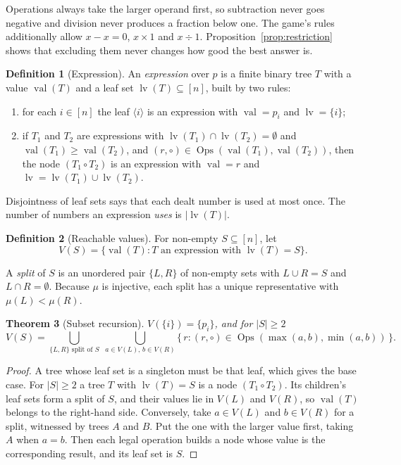 \documentclass[11pt,a4paper]{article}
\newtheorem{theorem}{Theorem}[section]
\theoremstyle{definition}
\newtheorem{definition}[theorem]{Definition}
\theoremstyle{remark}
\newcommand{\Ops}{\operatorname{Ops}}
\newcommand{\val}{\operatorname{val}}
\newcommand{\leaves}{\operatorname{lv}}
\newcommand{\mask}{\mu}
\begin{document}
Operations always take the larger operand first, so subtraction never goes negative and division never
produces a fraction below one. The game's rules additionally allow $x - x = 0$, $x \times 1$ and $x \div 1$.
Proposition~\ref{prop:restriction} shows that excluding them never changes how good the best answer is.

\begin{definition}[Expression]\label{def:expr}
An \emph{expression} over $p$ is a finite binary tree $T$ with a value $\val(T)$ and a leaf set
$\leaves(T) \subseteq [n]$, built by two rules:
\begin{enumerate}[label=(\roman*)]
\item for each $i \in [n]$ the leaf $\langle i \rangle$ is an expression with $\val = p_i$ and $\leaves = \{i\}$;
\item if $T_1$ and $T_2$ are expressions with $\leaves(T_1) \cap \leaves(T_2) = \emptyset$ and
      $\val(T_1) \ge \val(T_2)$, and $(r, \circ) \in \Ops(\val(T_1), \val(T_2))$, then the node
      $(T_1 \circ T_2)$ is an expression with $\val = r$ and $\leaves = \leaves(T_1) \cup \leaves(T_2)$.
\end{enumerate}
\end{definition}

Disjointness of leaf sets says that each dealt number is used at most once. The number of numbers an
expression \emph{uses} is $|\leaves(T)|$.

\begin{definition}[Reachable values]
For non-empty $S \subseteq [n]$, let
\[
V(S) = \{\val(T) : T \text{ an expression with } \leaves(T) = S\}.
\]
\end{definition}

A \emph{split} of $S$ is an unordered pair $\{L, R\}$ of non-empty sets with $L \cup R = S$ and
$L \cap R = \emptyset$. Because $\mask$ is injective, each split has a unique representative with
$\mask(L) < \mask(R)$.

\begin{theorem}[Subset recursion]\label{thm:recursion}
$V(\{i\}) = \{p_i\}$, and for $|S| \ge 2$
\[
V(S) = \bigcup_{\{L, R\} \text{ split of } S} \;
       \bigcup_{a \in V(L),\, b \in V(R)}
       \{\, r : (r, \circ) \in \Ops(\max(a, b), \min(a, b)) \,\}.
\]
\end{theorem}

\begin{proof}
A tree whose leaf set is a singleton must be that leaf, which gives the base case. For $|S| \ge 2$ a tree $T$
with $\leaves(T) = S$ is a node $(T_1 \circ T_2)$. Its children's leaf sets form a split of $S$, and their
values lie in $V(L)$ and $V(R)$, so $\val(T)$ belongs to the right-hand side. Conversely, take $a \in V(L)$
and $b \in V(R)$ for a split, witnessed by trees $A$ and $B$. Put the one with the larger value first, taking
$A$ when $a = b$. Then each legal operation builds a node whose value is the corresponding result, and its
leaf set is $S$.
\end{proof}
\end{document}
